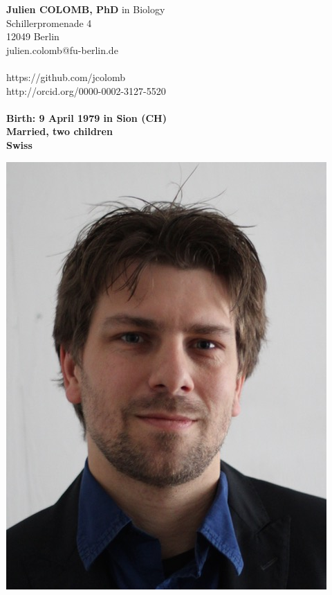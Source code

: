 \begin{minipage}[t]{\textwidth}
    \begin{minipage}[b]{0.5\textwidth}
        \textbf{Julien COLOMB, PhD} in Biology\\
        Schillerpromenade 4\\
        12049 Berlin\\
        julien.colomb@fu-berlin.de\\
         \\
        https://github.com/jcolomb\\
         http://orcid.org/0000-0002-3127-5520\\
         \\
   
        \textbf{Birth: 9 April 1979 in Sion (CH)}\\
        \textbf{Married, two children}\\
        \textbf{Swiss}
         
    \end{minipage}\hfill
    \begin{minipage}[b]{0.5\textwidth}
        \begin{flushright}
            \includegraphics[scale=0.3] {figures/photo_CV.jpg}
        \end{flushright}
    \end{minipage}
\end{minipage}\\

